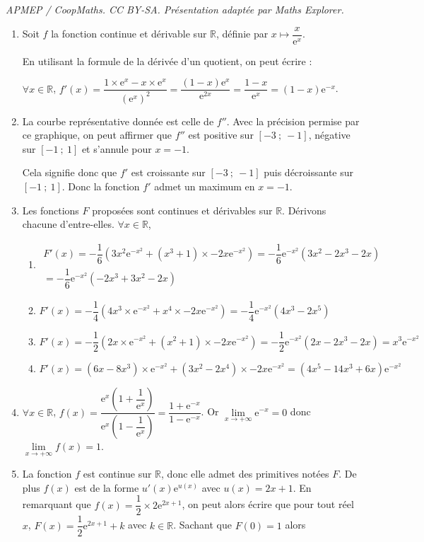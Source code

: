 \documentclass[10pt]{article}
\providecommand{\R}{\mathbb{R}}
\providecommand{\e}{{\mathrm{e}}}
\begin{document}
\noindent\textit{APMEP / CoopMaths. CC BY-SA. Présentation adaptée par Maths Explorer.}\par\medskip
\medskip

\begin{enumerate}
	\item Soit $f$ la fonction continue et dérivable sur $\R$, définie par $x \longmapsto \dfrac{x}{\text{e}^x}$.
	
	En utilisant la formule de la dérivée d'un quotient, on peut écrire :
	
	$\forall x \in \R$, $f'(x)=\dfrac{1\times \e^{x}-x\times \e^x}{\left(\e^x\right)^2}=\dfrac{(1-x)\e^x}{\e^{2x}}=\dfrac{1-x}{\e^x}=(1-x)\e^{-x}$. \hfill {}
	\item La courbe représentative donnée est celle de $f''$. Avec la précision permise par ce graphique, on peut affirmer que $f''$ est positive sur $[-3~;~-1]$, négative sur $[-1~;~1]$ et s'annule pour $x= - 1$. 
	
Cela signifie donc que $f'$ est croissante sur $[-3~;~-1]$ puis décroissante sur $[-1~;~1]$. Donc la fonction $f'$ admet un maximum en $x = -1$. \hfill {}
	\item Les fonctions $F$ proposées sont continues et dérivables sur $\R$. Dérivons chacune d'entre-elles. $\forall x \in \R$, 
	\begin{enumerate}
		\item $\begin{gathered}F'(x)=-\dfrac{1}{6}\left(3x^2\e^{-x^2}+(x^3+1)\times -2x\e^{-x^2}\right)=-\dfrac{1}{6}\e^{-x^2}(3x^2-2x^3-2x)\\=-\dfrac{1}{6}\e^{-x^2}(-2x^3+3x^2-2x)\end{gathered}$
		\item $F'(x)=-\dfrac{1}{4}\left(4x^3 \times \e^{-x^2}+x^4\times -2x\e^{-x^2}\right)=-\dfrac{1}{4}\e^{-x^2}(4x^3-2x^5)$
		\item $F'(x)=-\dfrac{1}{2}\left(2x\times \e^{-x^2}+(x^2+1)\times -2x\e^{-x^2}\right)=-\dfrac{1}{2}\e^{-x^2}(2x-2x^3-2x)=x^3\e^{-x^2}$
		\item $F'(x)=(6x-8x^3)\times \e^{-x^2}+(3x^2-2x^4)\times -2x\e^{-x^2}= (4x^5-14x^3+6x)\e^{-x^2} $
	\end{enumerate}
\hfill {}
	\item $\forall x \in \R$, $f(x)=\dfrac{\e^x\left(1+\dfrac{1}{\e^x}\right)}{\e^x\left(1-\dfrac{1}{\e^x}\right)}=\dfrac{1+\e^{-x}}{1-\e^{-x}}$. Or $\displaystyle\lim\limits_{x \rightarrow +\infty} \e^{-x}=0$ donc $\displaystyle\lim\limits_{x \rightarrow +\infty} f(x)=1$. \hfill {}
	\item La fonction $f$ est continue sur $\R$, donc elle admet des primitives notées $F$. De plus $f(x)$ est de la forme $u'(x)\e^{u(x)}$ avec $u(x)=2x+1$. En remarquant que $f(x)=\dfrac{1}{2} \times 2\e^{2x+1}$, on peut alors écrire que pour tout réel $x$, $F(x)=\dfrac{1}{2}\e^{2x+1}+k$ avec $k\in \R$. Sachant que $F(0)=1$ alors
	

\end{enumerate}
\end{document}
